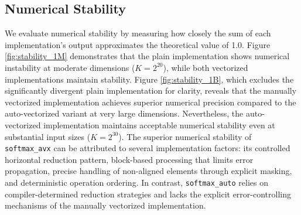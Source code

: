 \documentclass[10pt]{report}
\begin{document}
\subsection*{Numerical Stability}
We evaluate numerical stability by measuring how closely the sum of each implementation's output approximates the theoretical value of 1.0. Figure \ref{fig:stability_1M} demonstrates that the plain implementation shows numerical instability at moderate dimensions ($K = 2^{20}$), while both vectorized implementations maintain stability. Figure \ref{fig:stability_1B}, which excludes the significantly divergent plain implementation for clarity, reveals that the manually vectorized implementation achieves superior numerical precision compared to the auto-vectorized variant at very large dimensions. Nevertheless, the auto-vectorized implementation maintains acceptable numerical stability even at substantial input sizes ($K=2^{30}$). The superior numerical stability of \texttt{softmax\_avx} can be attributed to several implementation factors: its controlled horizontal reduction pattern, block-based processing that limits error propagation, precise handling of non-aligned elements through explicit masking, and deterministic operation ordering. In contrast, \texttt{softmax\_auto} relies on compiler-determined reduction strategies and lacks the explicit error-controlling mechanisms of the manually vectorized implementation.
\end{document}
